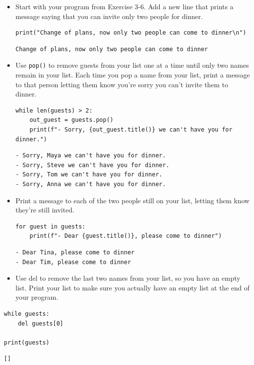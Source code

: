\documentclass[10pt]{book}
\begin{document}
\begin{enumerate}
\begin{itemize}
\item Start with your program from Exercise 3-6. Add a new line that prints a message saying that you can invite only two people for dinner.
\begin{verbatim}
print("Change of plans, now only two people can come to dinner\n")
\end{verbatim}

\label{org8514122}
\begin{verbatim}
Change of plans, now only two people can come to dinner
\end{verbatim}

\item Use \texttt{pop()} to remove guests from your list one at a time until only two names remain in your list. Each time you pop a name from your list, print a message to that person letting them know you’re sorry you can’t invite them to dinner.
\begin{verbatim}
while len(guests) > 2:
    out_guest = guests.pop()
    print(f"- Sorry, {out_guest.title()} we can't have you for dinner.")
\end{verbatim}

\label{org8d874d6}
\begin{verbatim}
- Sorry, Maya we can't have you for dinner.
- Sorry, Steve we can't have you for dinner.
- Sorry, Tom we can't have you for dinner.
- Sorry, Anna we can't have you for dinner.
\end{verbatim}

\item Print a message to each of the two people still on your list, letting them know they’re still invited.
\begin{verbatim}
for guest in guests:
    print(f"- Dear {guest.title()}, please come to dinner")
\end{verbatim}

\label{org5edac83}
\begin{verbatim}
- Dear Tina, please come to dinner
- Dear Tim, please come to dinner
\end{verbatim}

\item Use del to remove the last two names from your list, so you have an empty list. Print your list to make sure you actually have an empty list at the end of your program.
\end{itemize}
\begin{verbatim}
while guests:
    del guests[0]

print(guests)
\end{verbatim}

\label{org19f0ef8}
\begin{verbatim}
[]
\end{verbatim}
\end{enumerate}
\end{document}
